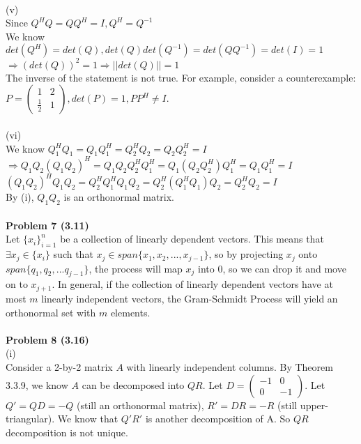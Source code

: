 \documentclass[letterpaper,12pt]{article}
\theoremstyle{definition}
\begin{document}
\\
(v)\\
Since $Q^HQ=QQ^H=I, Q^H = Q^{-1}$\\
We know $det(Q^H) = det(Q), det(Q)det(Q^{-1}) = det(QQ^{-1}) = det(I) = 1 $\\
$\Rightarrow (det(Q))^2 = 1\Rightarrow ||det(Q)||=1$\\
The inverse of the statement is not true. For example, consider a counterexample:\\
$P = \begin{pmatrix}
1 & 2\\
\frac{1}{2} &1
\end{pmatrix}, det(P) = 1, PP^H \neq I.$\\
\\
(vi)\\
We know $Q_1^HQ_1=Q_1Q_1^H=Q_2^HQ_2=Q_2Q_2^H=I$\\
$\Rightarrow Q_1Q_2(Q_1Q_2)^H=Q_1Q_2Q_2^HQ_1^H=Q_1(Q_2Q_2^H)Q_1^H = Q_1Q_1^H=I$\\
$(Q_1Q_2)^HQ_1Q_2 = Q_2^HQ_1^HQ_1Q_2 = Q_2^H(Q_1^HQ_1)Q_2=Q_2^HQ_2 = I$\\
By (i), $Q_1Q_2$ is an orthonormal matrix. \\
\\
\noindent\textbf{Problem 7 (3.11)}\\
Let $\{x_i\}_{i=1}^n$ be a collection of linearly dependent vectors. This means that $\exists x_j\in \{x_i\}$ such that  $x_j \in span\{x_1, x_2, ..., x_{j-1}\}$, so by projecting $x_j$ onto $span\{q_1, q_2, ... q_{j-1}\}$, the process will map $x_j$ into $0$, so we can drop it and move on to $x_{j+1}$. In general, if the collection of linearly dependent vectors have at most $m$ linearly independent vectors, the Gram-Schmidt Process will yield an orthonormal set with $m$ elements.\\
\\
\noindent\textbf{Problem 8 (3.16)}\\
(i)\\
Consider a 2-by-2 matrix $A$ with linearly independent columns. By Theorem 3.3.9, we know $A$ can be decomposed into $QR$. Let $D = \begin{pmatrix}
-1 & 0\\
0 & -1
\end{pmatrix}$. Let $Q' = QD = -Q$ (still an orthonormal matrix), $R' = DR = -R$ (still upper-triangular). We know that $Q'R'$ is another decomposition of A. So $QR$ decomposition is not unique.\\
\\
\end{document}
